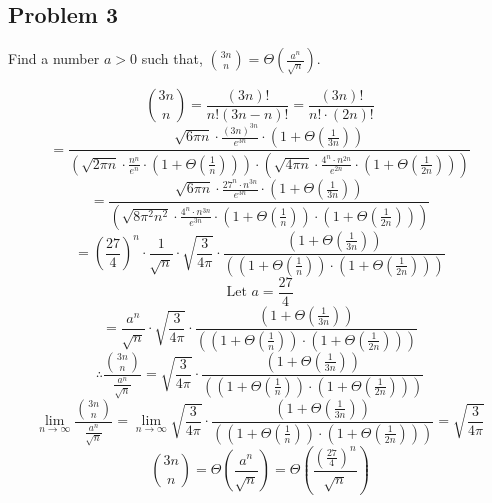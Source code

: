 \documentclass{article}
\begin{document}
\subsection{Problem 3}
Find a number $a > 0$ such that, $\binom{3n}{n} = \Theta(\frac{a^n}{\sqrt{n}})$.

$$\binom{3n}{n} = \frac{(3n)!}{n!(3n-n)!} = \frac{(3n)!}{n! \cdot (2n)!}$$
$$= \frac{\sqrt{6\pi n} \cdot \frac{(3n)^{3n}}{e^{3n}} \cdot (1 + \Theta(\frac{1}{3n})) }{(\sqrt{2\pi n} \cdot \frac{n^n}{e^n} \cdot (1 + \Theta(\frac{1}{n})) ) \cdot (\sqrt{4 \pi n} \cdot \frac{4^n \cdot n^{2n}}{e^{2n}} \cdot (1 + \Theta(\frac{1}{2n})))  }$$
$$= \frac{\sqrt{6\pi n} \cdot \frac{27^n \cdot n^{3n}}{e^{3n}} \cdot (1 + \Theta(\frac{1}{3n})) }{(\sqrt{8\pi^2 n^2} \cdot \frac{4^n \cdot n^{3n}}{e^{3n}} \cdot (1 + \Theta(\frac{1}{n})) \cdot (1 + \Theta(\frac{1}{2n})))}$$
$$= (\frac{27}{4})^n \cdot \frac{1}{\sqrt{n}} \cdot \sqrt{\frac{3}{4\pi}} \cdot \frac{(1 + \Theta(\frac{1}{3n})) }{((1 + \Theta(\frac{1}{n})) \cdot (1 + \Theta(\frac{1}{2n})))}$$
$$\text{Let } a = \frac{27}{4}$$
$$= \frac{a^n}{\sqrt{n}} \cdot \sqrt{\frac{3}{4\pi}} \cdot \frac{(1 + \Theta(\frac{1}{3n})) }{((1 + \Theta(\frac{1}{n})) \cdot (1 + \Theta(\frac{1}{2n})))}$$
$$\therefore \frac{\binom{3n}{n}}{\frac{a^n}{\sqrt{n}}} = \sqrt{\frac{3}{4\pi}} \cdot \frac{(1 + \Theta(\frac{1}{3n})) }{((1 + \Theta(\frac{1}{n})) \cdot (1 + \Theta(\frac{1}{2n})))}$$
$$\lim_{n \rightarrow \infty} \frac{\binom{3n}{n}}{\frac{a^n}{\sqrt{n}}} = \lim_{n \rightarrow \infty} \sqrt{\frac{3}{4\pi}} \cdot \frac{(1 + \Theta(\frac{1}{3n})) }{((1 + \Theta(\frac{1}{n})) \cdot (1 + \Theta(\frac{1}{2n})))} = \sqrt{\frac{3}{4\pi}}$$
$$\binom{3n}{n} = \Theta(\frac{a^n}{\sqrt{n}}) = \Theta(\frac{(\frac{27}{4})^n}{\sqrt{n}})$$
\end{document}
